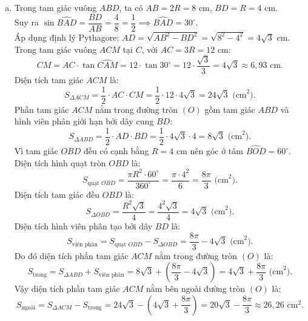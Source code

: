 \begin{bt}
{\begin{enumerate}[a)]
	Từ tính chất đối xứng và hệ thức tiếp tuyến của đường tròn qua các tam giác đồng dạng, ta suy ra $\widehat{OBK} = 90^\circ$, hay $KB \perp AB$ tại $B \in (O)$. Do đó $KB$ là tiếp tuyến của đường tròn $(O)$.
	\item Trong tam giác vuông $ABD$, ta có $AB = 2R = 8\text{ cm}$, $BD = R = 4\text{ cm}$.\\
	Suy ra $\sin \widehat{BAD} = \dfrac{BD}{AB} = \dfrac{4}{8} = \dfrac{1}{2} \implies \widehat{BAD} = 30^\circ$.\\
	Áp dụng định lý Pythagore: $AD = \sqrt{AB^2 - BD^2} = \sqrt{8^2 - 4^2} = 4\sqrt{3}\text{ cm}$.\\
	Trong tam giác vuông $ACM$ tại $C$, với $AC = 3R = 12\text{ cm}$:
	$$
	CM = AC \cdot \tan \widehat{CAM} = 12 \cdot \tan 30^\circ = 12 \cdot \dfrac{\sqrt{3}}{3} = 4\sqrt{3} \approx 6{,}93\text{ cm}.
	$$
	Diện tích tam giác $ACM$ là:
	$$
	S_{\Delta ACM} = \dfrac{1}{2} \cdot AC \cdot CM = \dfrac{1}{2} \cdot 12 \cdot 4\sqrt{3} = 24\sqrt{3}\text{ (cm}^2\text{)}.
	$$
	Phần tam giác $ACM$ nằm trong đường tròn $(O)$ gồm tam giác $ABD$ và hình viên phân giới hạn bởi dây cung $BD$:
	$$
	S_{\Delta ABD} = \dfrac{1}{2} \cdot AD \cdot BD = \dfrac{1}{2} \cdot 4\sqrt{3} \cdot 4 = 8\sqrt{3}\text{ (cm}^2\text{)}.
	$$
	Vì tam giác $OBD$ đều có cạnh bằng $R = 4\text{ cm}$ nên góc ở tâm $\widehat{BOD} = 60^\circ$.\\
	Diện tích hình quạt tròn $OBD$ là:
	$$
	S_{\text{quạt } OBD} = \dfrac{\pi R^2 \cdot 60^\circ}{360^\circ} = \dfrac{\pi \cdot 4^2}{6} = \dfrac{8\pi}{3}\text{ (cm}^2\text{)}.
	$$
	Diện tích tam giác đều $OBD$ là:
	$$
	S_{\Delta OBD} = \dfrac{R^2\sqrt{3}}{4} = \dfrac{4^2\sqrt{3}}{4} = 4\sqrt{3}\text{ (cm}^2\text{)}.
	$$
	Diện tích hình viên phân tạo bởi dây $BD$ là:
	$$
	S_{\text{viên phân}} = S_{\text{quạt } OBD} - S_{\Delta OBD} = \dfrac{8\pi}{3} - 4\sqrt{3}\text{ (cm}^2\text{)}.
	$$
	Do đó diện tích phần tam giác $ACM$ nằm trong đường tròn $(O)$ là:
	$$
	S_{\text{trong}} = S_{\Delta ABD} + S_{\text{viên phân}} = 8\sqrt{3} + \left(\dfrac{8\pi}{3} - 4\sqrt{3}\right) = 4\sqrt{3} + \dfrac{8\pi}{3}\text{ (cm}^2\text{)}.
	$$
	Vậy diện tích phần tam giác $ACM$ nằm bên ngoài đường tròn $(O)$ là:
	$$
	S_{\text{ngoài}} = S_{\Delta ACM} - S_{\text{trong}} = 24\sqrt{3} - \left(4\sqrt{3} + \dfrac{8\pi}{3}\right) = 20\sqrt{3} - \dfrac{8\pi}{3} \approx 26{,}26\text{ cm}^2.
	$$
\end{enumerate}
}
\end{bt}

